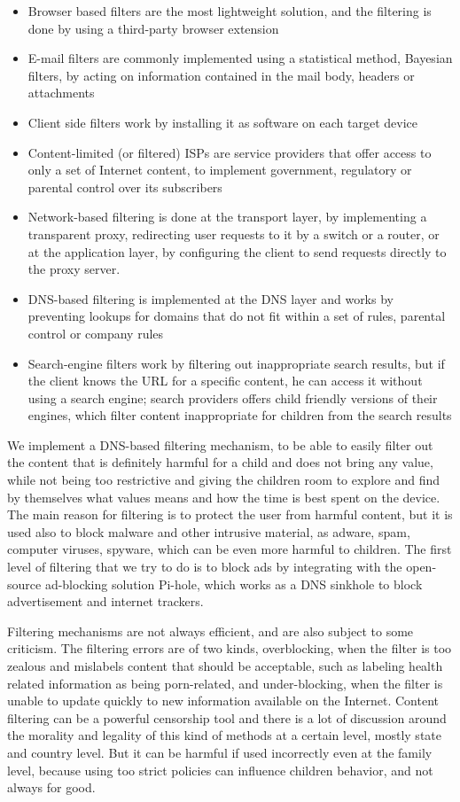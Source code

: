 \begin{itemize}
\item Browser based filters are the most lightweight solution, and the filtering is done by using a third-party browser extension
\item E-mail filters are commonly implemented using a statistical method, Bayesian filters, by acting on information contained in the mail body, headers or attachments
\item Client side filters work by installing it as software on each target device
\item Content-limited (or filtered) ISPs are service providers that offer access to only a set of Internet content, to implement government, regulatory or parental control over its subscribers
\item Network-based filtering is done at the transport layer, by implementing a transparent proxy, redirecting user requests to it by a switch or a router, or at the application layer, by configuring the client to send requests directly to the proxy server. \parencite{contentGateway}
\item DNS-based filtering is implemented at the DNS layer and works by preventing lookups for domains that do not fit within a set of rules, parental control or company rules
\item Search-engine filters work by filtering out inappropriate search results, but if the client knows the URL for a specific content, he can access it without using a search engine; search providers offers child friendly versions of their engines, which filter content inappropriate for children from the search results
\end{itemize}

We implement a DNS-based filtering mechanism, to be able to easily filter out the content that is definitely harmful for a child and does not bring any value, while not being too restrictive and giving the children room to explore and find by themselves what values means and how the time is best spent on the device. The main reason for filtering is to protect the user from harmful content, but it is used also to block malware and other intrusive material, as adware, spam, computer viruses, spyware, which can be even more harmful to children. The first level of filtering that we try to do is to block ads by integrating with the open-source ad-blocking solution Pi-hole, which works as a DNS sinkhole to block advertisement and internet trackers.

Filtering mechanisms are not always efficient, and are also subject to some criticism. The filtering errors are of two kinds, overblocking, when the filter is too zealous and mislabels content that should be acceptable, such as labeling health related information as being porn-related, and under-blocking, when the filter is unable to update quickly to new information available on the Internet. Content filtering can be a powerful censorship tool and there is a lot of discussion around the morality and legality of this kind of methods at a certain level, mostly state and country level. But it can be harmful if used incorrectly even at the family level, because using too strict policies can influence children behavior, and not always for good.

